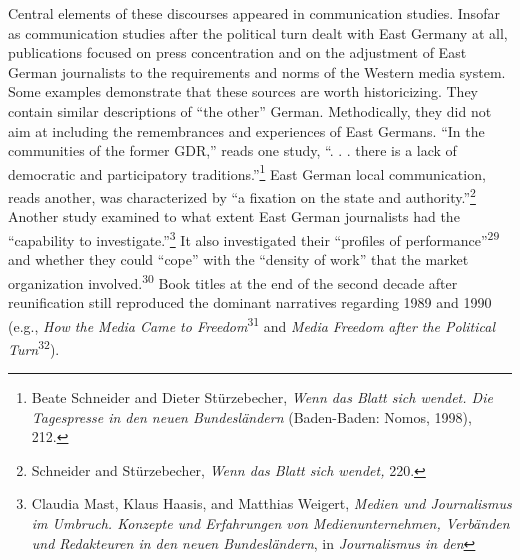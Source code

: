 \documentclass{tufte-handout}
\begin{document}
Central elements of these discourses appeared in communication studies.
Insofar as communication studies after the political turn dealt with
East Germany at all, publications focused on press concentration and on
the adjustment of East German journalists to the requirements and norms
of the Western media system. Some examples demonstrate that these
sources are worth historicizing. They contain similar descriptions of
``the other'' German. Methodically, they did not aim at including the
remembrances and experiences of East Germans. ``In the communities of
the former GDR,'' reads one study, ``. . . there is a lack of democratic
and participatory traditions.''\footnote{Beate Schneider and Dieter Stürzebecher, \emph{Wenn das Blatt sich
  wendet. Die Tagespresse in den neuen Bundesländern} (Baden-Baden:
  Nomos, 1998), 212.
}
East German local communication, reads another, was characterized by ``a
fixation on the state and
authority.''\footnote{Schneider and Stürzebecher, \emph{Wenn das Blatt sich wendet,} 220.
} Another study
examined to what extent East German journalists had the ``capability to
investigate.''\footnote{Claudia Mast, Klaus Haasis, and Matthias Weigert, \emph{Medien und
  Journalismus im Umbruch. Konzepte und Erfahrungen von
  Medienunternehmen, Verbänden und Redakteuren in den neuen
  Bundesländern}, in \emph{Journalismus in den}}
  It also
investigated their ``profiles of
performance''\textsuperscript{29} and whether they
could ``cope'' with the ``density of work'' that the market organization
involved.\textsuperscript{30} Book titles at the end
of the second decade after reunification still reproduced the dominant
narratives regarding 1989 and 1990 (e.g., \emph{How the Media Came to
Freedom}\textsuperscript{31} and \emph{Media Freedom
after the Political Turn}\textsuperscript{32}).
\end{document}
